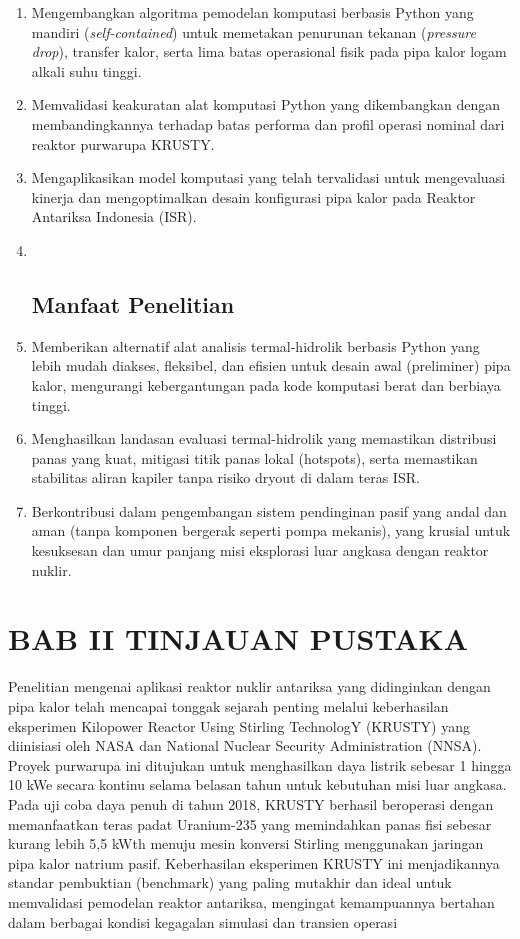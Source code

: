 \documentclass[
]{article}
\begin{document}
\begin{enumerate}
  Tujuan dari penelitian ini adalah sebagai berikut:
\item
  Mengembangkan algoritma pemodelan komputasi berbasis Python yang
  mandiri (\emph{self-contained}) untuk memetakan penurunan tekanan
  (\emph{pressure drop}), transfer kalor, serta lima batas operasional
  fisik pada pipa kalor logam alkali suhu tinggi.
\item
  Memvalidasi keakuratan alat komputasi Python yang dikembangkan dengan
  membandingkannya terhadap batas performa dan profil operasi nominal
  dari reaktor purwarupa KRUSTY.
\item
  Mengaplikasikan model komputasi yang telah tervalidasi untuk
  mengevaluasi kinerja dan mengoptimalkan desain konfigurasi pipa kalor
  pada Reaktor Antariksa Indonesia (ISR).
\item ~
  \subsection{\texorpdfstring{\textbf{Manfaat
  Penelitian}}{Manfaat Penelitian}}\label{manfaat-penelitian}
\item
  Memberikan alternatif alat analisis termal-hidrolik berbasis Python
  yang lebih mudah diakses, fleksibel, dan efisien untuk desain awal
  (preliminer) pipa kalor, mengurangi kebergantungan pada kode komputasi
  berat dan berbiaya tinggi.
\item
  Menghasilkan landasan evaluasi termal-hidrolik yang memastikan
  distribusi panas yang kuat, mitigasi titik panas lokal (hotspots),
  serta memastikan stabilitas aliran kapiler tanpa risiko dryout di
  dalam teras ISR.
\item
  Berkontribusi dalam pengembangan sistem pendinginan pasif yang andal
  dan aman (tanpa komponen bergerak seperti pompa mekanis), yang krusial
  untuk kesuksesan dan umur panjang misi eksplorasi luar angkasa dengan
  reaktor nuklir.
\end{enumerate}

\section{\texorpdfstring{\textbf{BAB II} \textbf{TINJAUAN
PUSTAKA}}{BAB II TINJAUAN PUSTAKA}}\label{bab-ii-tinjauan-pustaka}

Penelitian mengenai aplikasi reaktor nuklir antariksa yang didinginkan
dengan pipa kalor telah mencapai tonggak sejarah penting melalui
keberhasilan eksperimen Kilopower Reactor Using Stirling TechnologY
(KRUSTY) yang diinisiasi oleh NASA dan National Nuclear Security
Administration (NNSA). Proyek purwarupa ini ditujukan untuk menghasilkan
daya listrik sebesar 1 hingga 10 kWe secara kontinu selama belasan tahun
untuk kebutuhan misi luar angkasa. Pada uji coba daya penuh di tahun
2018, KRUSTY berhasil beroperasi dengan memanfaatkan teras padat
Uranium-235 yang memindahkan panas fisi sebesar kurang lebih 5,5 kWth
menuju mesin konversi Stirling menggunakan jaringan pipa kalor natrium
pasif. Keberhasilan eksperimen KRUSTY ini menjadikannya standar
pembuktian (benchmark) yang paling mutakhir dan ideal untuk memvalidasi
pemodelan reaktor antariksa, mengingat kemampuannya bertahan dalam
berbagai kondisi kegagalan simulasi dan transien operasi
\end{document}
